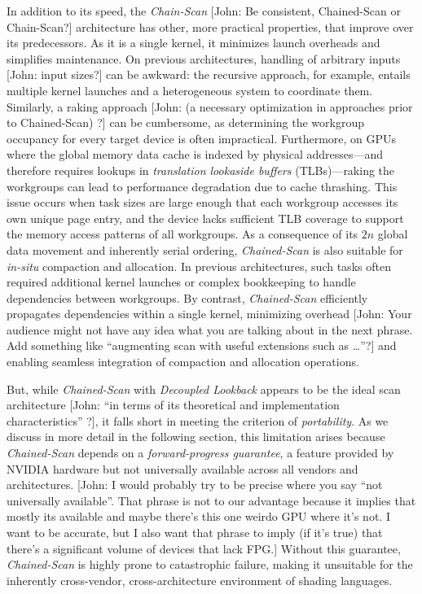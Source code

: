 \documentclass[sigconf]{acmart}
\newcommand{\john}[1]{{\footnotesize\color{cyan}[John: #1]}}
\begin{document}
In addition to its speed, the \emph{Chain-Scan} \john{Be consistent, Chained-Scan or Chain-Scan?} architecture has other, more practical properties, that improve over its predecessors. As it is a single kernel, it minimizes launch overheads and simplifies maintenance. On previous architectures, handling of arbitrary inputs \john{input sizes?} can be awkward: the recursive approach, for example, entails multiple kernel launches and a heterogeneous system to coordinate them. Similarly, a raking approach \john{(a necessary optimization in approaches prior to Chained-Scan) ?} can be cumbersome, as determining the workgroup occupancy for every target device is often impractical. Furthermore, on GPUs where the global memory data cache is indexed by physical addresses—and therefore requires lookups in \emph{translation lookaside buffers} (TLBs)—raking the workgroups can lead to performance degradation due to cache thrashing. This issue occurs when task sizes are large enough that each workgroup accesses its own unique page entry, and the device lacks sufficient TLB coverage to support the memory access patterns of all workgroups. As a consequence of its $2n$ global data movement and inherently serial ordering, \emph{Chained-Scan} is also suitable for \emph{in-situ} compaction and allocation. In previous architectures, such tasks often required additional kernel launches or complex bookkeeping to handle dependencies between workgroups. By contrast, \emph{Chained-Scan} efficiently propagates dependencies within a single kernel, minimizing overhead \john{Your audience might not have any idea what you are talking about in the next phrase. Add something like ``augmenting scan with useful extensions such as \ldots''?} and enabling seamless integration of compaction and allocation operations.

But, while \emph{Chained-Scan} with \emph{Decoupled Lookback} appears to be the ideal scan architecture \john{``in terms of its theoretical and implementation characteristics'' ?}, it falls short in meeting the criterion of \emph{portability}. As we discuss in more detail in the following section, this limitation arises because \emph{Chained-Scan} depends on a \emph{forward-progress guarantee}, a feature provided by NVIDIA hardware but not universally available across all vendors and architectures. \john{I would probably try to be precise where you say ``not universally available''. That phrase is not to our advantage because it implies that mostly its available and maybe there's this one weirdo GPU where it's not. I want to be accurate, but I also want that phrase to imply (if it's true) that there's a significant volume of devices that lack FPG\@.} Without this guarantee, \emph{Chained-Scan} is highly prone to catastrophic failure, making it unsuitable for the inherently cross-vendor, cross-architecture environment of shading languages.
\end{document}
